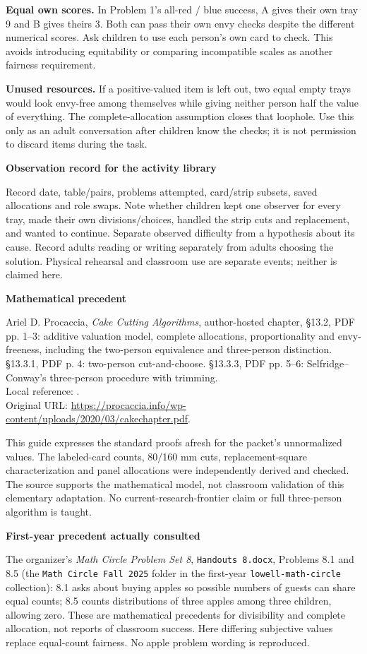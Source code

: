 \documentclass[11pt]{article}
\newcommand{\heading}[1]{\par\vspace{1.5mm}{\large\bfseries #1}\par\vspace{.8mm}}
\newcommand{\subhead}[1]{\par\vspace{1mm}\textbf{#1}\par}
\newcommand{\page}[1]{\newpage\heading{#1}}
\begin{document}
\textbf{Equal own scores.} In Problem 1's all-red / blue success, A gives their own tray 9 and B gives theirs 3. Both can pass their own envy checks despite the different numerical scores. Ask children to use each person's own card to check. This avoids introducing equitability or comparing incompatible scales as another fairness requirement.

\textbf{Unused resources.} If a positive-valued item is left out, two equal empty trays would look envy-free among themselves while giving neither person half the value of everything. The complete-allocation assumption closes that loophole. Use this only as an adult conversation after children know the checks; it is not permission to discard items during the task.

\subhead{Observation record for the activity library}
Record date, table/pairs, problems attempted, card/strip subsets, saved allocations and role swaps. Note whether children kept one observer for every tray, made their own divisions/choices, handled the strip cuts and replacement, and wanted to continue. Separate observed difficulty from a hypothesis about its cause. Record adults reading or writing separately from adults choosing the solution. Physical rehearsal and classroom use are separate events; neither is claimed here.

\page{Sources and original adaptation}
\subhead{Mathematical precedent}
Ariel D. Procaccia, \emph{Cake Cutting Algorithms}, author-hosted chapter, \S13.2, PDF pp. 1--3: additive valuation model, complete allocations, proportionality and envy-freeness, including the two-person equivalence and three-person distinction. \S13.3.1, PDF p. 4: two-person cut-and-choose. \S13.3.3, PDF pp. 5--6: Selfridge--Conway's three-person procedure with trimming.\\
{\small Local reference: .\\
Original URL: \url{https://procaccia.info/wp-content/uploads/2020/03/cakechapter.pdf}.}

This guide expresses the standard proofs afresh for the packet's unnormalized values. The labeled-card counts, 80/160 mm cuts, replacement-square characterization and panel allocations were independently derived and checked. The source supports the mathematical model, not classroom validation of this elementary adaptation. No current-research-frontier claim or full three-person algorithm is taught.

\subhead{First-year precedent actually consulted}
The organizer's \emph{Math Circle Problem Set 8}, \texttt{Handouts 8.docx}, Problems 8.1 and 8.5 (the \texttt{Math Circle Fall 2025} folder in the first-year \texttt{lowell-math-circle} collection): 8.1 asks about buying apples so possible numbers of guests can share equal counts; 8.5 counts distributions of three apples among three children, allowing zero. These are mathematical precedents for divisibility and complete allocation, not reports of classroom success. Here differing subjective values replace equal-count fairness. No apple problem wording is reproduced.
\end{document}
